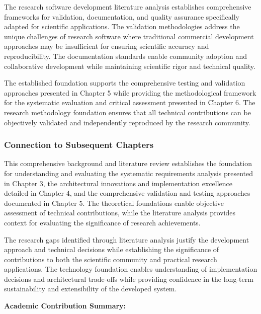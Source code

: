 \documentclass[11pt,a4paper]{report}
\begin{document}
The research software development literature analysis establishes comprehensive frameworks for validation,
documentation, and quality assurance specifically adapted for scientific applications. The validation methodologies
address the unique challenges of research software where traditional commercial development approaches may be
insufficient for ensuring scientific accuracy and reproducibility. The documentation standards enable community adoption
and collaborative development while maintaining scientific rigor and technical quality.

The established foundation supports the comprehensive testing and validation approaches presented in Chapter 5 while
providing the methodological framework for the systematic evaluation and critical assessment presented in Chapter 6. The
research methodology foundation ensures that all technical contributions can be objectively validated and independently
reproduced by the research community.

\subsubsection{Connection to Subsequent Chapters}

This comprehensive background and literature review establishes the foundation for understanding and evaluating the
systematic requirements analysis presented in Chapter 3, the architectural innovations and implementation excellence
detailed in Chapter 4, and the comprehensive validation and testing approaches documented in Chapter 5. The theoretical
foundations enable objective assessment of technical contributions, while the literature analysis provides context for
evaluating the significance of research achievements.

The research gaps identified through literature analysis justify the development approach and technical decisions while
establishing the significance of contributions to both the scientific community and practical research applications. The
technology foundation enables understanding of implementation decisions and architectural trade-offs while providing
confidence in the long-term sustainability and extensibility of the developed system.

\textbf{Academic Contribution Summary:}
\end{document}
